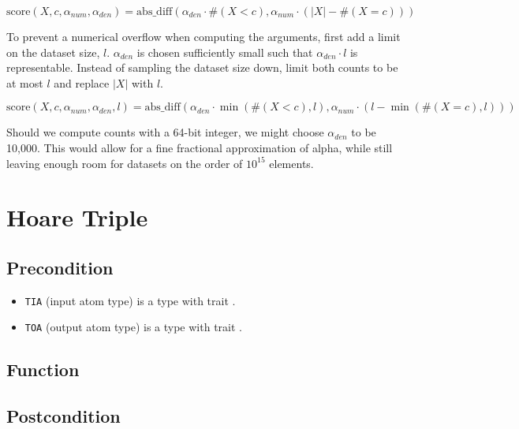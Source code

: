 \documentclass{article}
\begin{document}
\begin{equation}
    \textrm{score}(X, c, \alpha_{num}, \alpha_{den}) = \mathrm{abs\_diff}(\alpha_{den} \cdot \#(X < c), \alpha_{num} \cdot (|X| - \#(X = c)))
\end{equation}

To prevent a numerical overflow when computing the arguments, first add a limit on the dataset size, $l$.
$\alpha_{den}$ is chosen sufficiently small such that $\alpha_{den} \cdot l$ is representable.
Instead of sampling the dataset size down, limit both counts to be at most $l$ and replace $|X|$ with $l$.

\begin{equation}
    \textrm{score}(X, c, \alpha_{num}, \alpha_{den}, l) = \mathrm{abs\_diff}(\alpha_{den} \cdot \min(\#(X < c), l), \alpha_{num} \cdot (l - \min(\#(X = c), l)))
\end{equation}

Should we compute counts with a 64-bit integer, we might choose $\alpha_{den}$ to be 10,000.
This would allow for a fine fractional approximation of alpha,
while still leaving enough room for datasets on the order of $10^{15}$ elements.

\section{Hoare Triple}
\subsection*{Precondition}
\begin{itemize}
    \item \texttt{TIA} (input atom type) is a type with trait .
    \item \texttt{TOA} (output atom type) is a type with trait .
\end{itemize}


\subsection*{Function}
\label{sec:python-pseudocode}



\subsection*{Postcondition}
\end{document}
